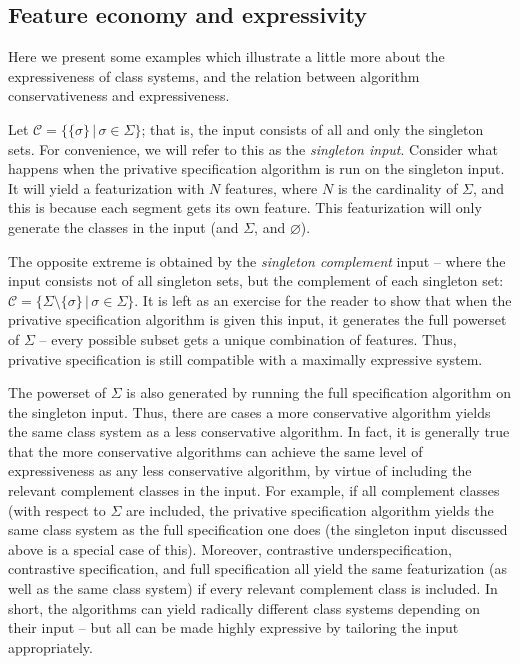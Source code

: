 \documentclass[11pt, oneside]{article}   	%
\begin{document}
\subsection{Feature economy and expressivity}

Here we present some examples which illustrate a little more about the expressiveness of class systems, and the relation between algorithm conservativeness and expressiveness.

Let $\mathcal C = \{ \{\sigma\} \, | \, \sigma \in \Sigma \}$; that is, the input consists of all and only the singleton sets. For convenience, we will refer to this as the \textit{singleton input}. Consider what happens when the privative specification algorithm is run on the singleton input. It will yield a featurization with $N$ features, where $N$ is the cardinality of $\Sigma$, and this is because each segment gets its own feature. This featurization will only generate the classes in the input (and $\Sigma$, and $\varnothing$).

The opposite extreme is obtained by the \textit{singleton complement} input -- where the input consists not of all singleton sets, but the complement of each singleton set:  $\mathcal C = \{ \Sigma \setminus \{\sigma\} \, | \, \sigma \in \Sigma \}$. It is left as an exercise for the reader to show that when the privative specification algorithm is given this input, it generates the full powerset of $\Sigma$ -- every possible subset gets a unique combination of features. Thus, privative specification is still compatible with a maximally expressive system.

The powerset of $\Sigma$ is also generated by running the full specification algorithm on the singleton input. Thus, there are cases a more conservative algorithm yields the same class system as a less conservative algorithm. In fact, it is generally true that the more conservative algorithms can achieve the same level of expressiveness as any less conservative algorithm, by virtue of including the relevant complement classes in the input. For example, if all complement classes (with respect to $\Sigma$ are included, the privative specification algorithm yields the same class system as the full specification one does (the singleton input discussed above is a special case of this). Moreover, contrastive underspecification, contrastive specification, and full specification all yield the same featurization (as well as the same class system) if every relevant complement class is included. In short, the algorithms can yield radically different class systems depending on their input -- but all can be made highly expressive by tailoring the input appropriately.
\end{document}

